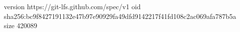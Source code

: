 version https://git-lfs.github.com/spec/v1
oid sha256:bc9f8427191132e47b97e90929fa49dfd9142217f41fd108c2ac069afa787b5a
size 420089

